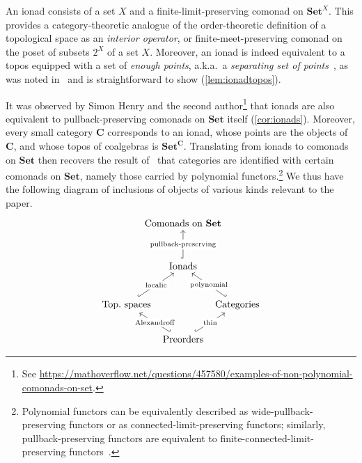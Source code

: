 \documentclass[11pt, oneside, article]{memoir}
\theoremstyle{plain}
\theoremstyle{definition}
\theoremstyle{remark}
\newcommand{\namedcat}[1]{\mathbf{#1}}
\newcommand{\cat}[1]{\mathbf{#1}}
\newcommand{\Set}{\namedcat{Set}}
\newcommand{\fun}[2]{{#2}^{#1}}
\newcommand{\xX}{X}
\newcommand{\bC}{\cat{C}}
\begin{document}
An ionad consists of a set $\xX$ and a finite-limit-preserving comonad
on $\Set^\xX$. This provides a category-theoretic analogue of the
order-theoretic definition of a topological space as an \emph{interior
  operator}, or finite-meet-preserving comonad on the poset of subsets
$2^\xX$ of a set $\xX$. Moreover, an ionad is indeed equivalent to a
topos equipped with a set of \emph{enough points}, a.k.a.\ a
\emph{separating set of points}~\cite[C2.2.12]{johnstone:elephant}, as
was noted in~\cite{garner:ionads} and is straightforward to show
(\cref{lem:ionadtopos}).


It was observed by Simon Henry and the second author\footnote{See
  \url{https://mathoverflow.net/questions/457580/examples-of-non-polynomial-comonads-on-set}.}
that ionads are also equivalent to pullback-preserving comonads on
$\Set$ itself (\cref{cor:ionads}).  Moreover, every small category
$\bC$ corresponds to an ionad, whose points are the objects of $\bC$,
and whose topos of coalgebras is $\fun{\bC}{\Set}$. Translating from
ionads to comonads on $\Set$ then recovers the result
of~\cite{ahman-uustalu} that categories are identified with certain
comonads on $\Set$, namely those carried by polynomial
functors.\footnote{Polynomial functors can be equivalently described
  as wide-pullback-preserving functors or as
  connected-limit-preserving functors; similarly, pullback-preserving
  functors are equivalent to finite-connected-limit-preserving
  functors~\cite[Lemma A1.2.9]{johnstone:elephant}.} We thus have the
following diagram of inclusions of objects of various kinds relevant
to the paper.
\[
  \begin{tikzcd}[column sep=-15pt, row sep=25pt]
    &\text{Comonads on $\Set$}\\[5pt]
    &\text{Ionads}\ar[hook, u, "\text{pullback-preserving}" description]\\
    \text{Top.\ spaces}\ar[hook, ur, "\text{localic}" description]&&\text{Categories}\ar[hook',ul, "\text{polynomial}" description]\\[-5pt]
    &\text{Preorders}\ar[hook', ul, "\text{Alexandroff}" description]\ar[hook,ur, "\text{thin}" description]
  \end{tikzcd}
\]
\end{document}
